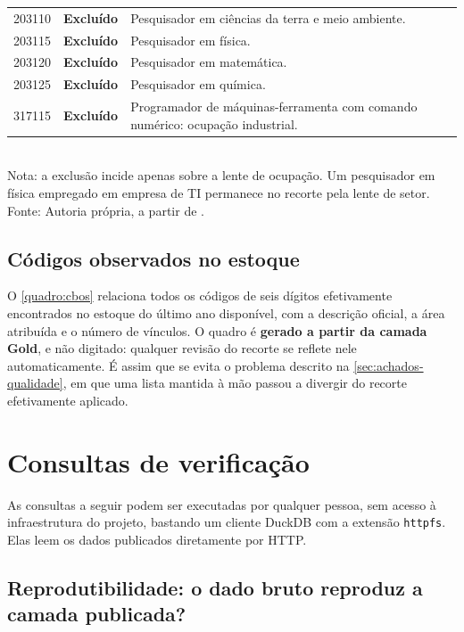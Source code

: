 \begin{apendicesenv}
\begin{quadro}[H]
\begin{tabular}{llp{7.6cm}}
        \midrule
        203110 & \textbf{Excluído} & Pesquisador em ciências da terra e meio ambiente. \\
        203115 & \textbf{Excluído} & Pesquisador em física. \\
        203120 & \textbf{Excluído} & Pesquisador em matemática. \\
        203125 & \textbf{Excluído} & Pesquisador em química. \\
        317115 & \textbf{Excluído} & Programador de máquinas-ferramenta com comando numérico: ocupação industrial. \\
        \bottomrule
    \end{tabular}
    \\[4pt]
    Nota: a exclusão incide apenas sobre a lente de ocupação. Um pesquisador em física
    empregado em empresa de TI permanece no recorte pela lente de setor. \\
    Fonte: Autoria própria, a partir de .
\end{quadro}

\section{Códigos observados no estoque}

O \autoref{quadro:cbos} relaciona todos os códigos de seis dígitos efetivamente encontrados no estoque do último ano disponível, com a descrição oficial, a área atribuída e o número de vínculos. O quadro é \textbf{gerado a partir da camada Gold}, e não digitado: qualquer revisão do recorte se reflete nele automaticamente. É assim que se evita o problema descrito na \autoref{sec:achados-qualidade}, em que uma lista mantida à mão passou a divergir do recorte efetivamente aplicado.



\chapter{Consultas de verificação}
\label{apend:consultas}

As consultas a seguir podem ser executadas por qualquer pessoa, sem acesso à infraestrutura do projeto, bastando um cliente DuckDB com a extensão \texttt{httpfs}. Elas leem os dados publicados diretamente por HTTP.

\section{Reprodutibilidade: o dado bruto reproduz a camada publicada?}


\end{apendicesenv}
